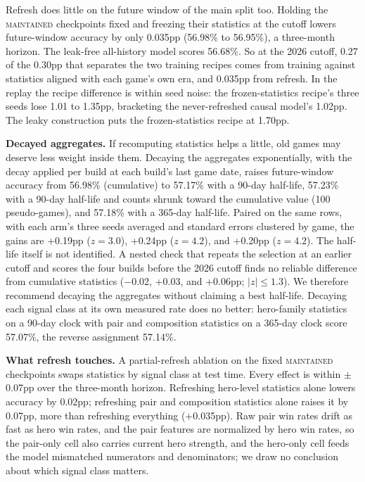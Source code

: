 \documentclass[journal]{IEEEtran}
\newcommand{\maintained}{\textsc{maintained}}          %
\begin{document}
Refresh does little on the future window of the main split too. Holding
the \maintained{} checkpoints fixed and freezing their statistics at the
cutoff lowers future-window accuracy by only 0.035pp (56.98\% to
56.95\%), a three-month horizon. The leak-free all-history model scores
56.68\%. So at the 2026 cutoff, 0.27 of the 0.30pp that separates the
two training recipes comes from training against statistics aligned with
each game's own era, and 0.035pp from refresh. In the replay the recipe
difference is within seed noise: the frozen-statistics recipe's three
seeds lose 1.01 to 1.35pp, bracketing the never-refreshed causal model's
1.02pp. The leaky construction puts the frozen-statistics recipe at
1.70pp.

\textbf{Decayed aggregates.} If recomputing statistics helps a little,
old games may deserve less weight inside them. Decaying the aggregates
exponentially, with the decay applied per build at each build's last
game date, raises future-window accuracy from 56.98\% (cumulative) to
57.17\% with a 90-day half-life, 57.23\% with a 90-day half-life and counts
shrunk toward the cumulative value (100 pseudo-games), and 57.18\% with a
365-day half-life. Paired on the same rows, with each arm's three seeds
averaged and standard errors clustered by game, the gains are +0.19pp
($z = 3.0$), +0.24pp ($z = 4.2$), and +0.20pp ($z = 4.2$). The half-life
itself is not identified. A nested check that repeats the selection at
an earlier cutoff and scores the four builds before the 2026 cutoff
finds no reliable difference from cumulative statistics ($-$0.02,
+0.03, and +0.06pp; $|z| \le 1.3$). We therefore recommend decaying the
aggregates without claiming a best half-life. Decaying each signal class
at its own measured rate does no better: hero-family statistics on a
90-day clock with pair and composition statistics on a 365-day clock
score 57.07\%, the reverse assignment 57.14\%.

\textbf{What refresh touches.} A partial-refresh ablation on the fixed
\maintained{} checkpoints swaps statistics by signal class at test time.
Every effect is within $\pm$0.07pp over the three-month horizon.
Refreshing hero-level statistics alone lowers accuracy by 0.02pp;
refreshing pair and composition statistics alone raises it by 0.07pp,
more than refreshing everything (+0.035pp). Raw pair win rates drift as
fast as hero win rates, and the pair features are normalized by hero
win rates, so the pair-only cell also carries current hero strength,
and the hero-only cell feeds the model mismatched numerators and
denominators; we draw no conclusion about which signal class matters.
\end{document}
